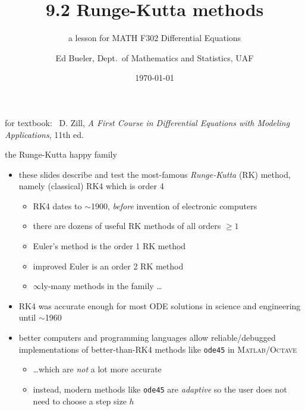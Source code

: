 \documentclass[urlcolor=blue,dvipsnames]{beamer}
\title{9.2 Runge-Kutta methods}
\subtitle{a lesson for MATH F302 Differential Equations}
\author{Ed Bueler, Dept.~of Mathematics and Statistics, UAF}
\date{\tiny \today}
\newcommand{\Matlab}{\textsc{Matlab}\xspace}
\newcommand{\Octave}{\textsc{Octave}\xspace}
\begin{document}
\renewcommand{\thefootnote}{{\color{green} \arabic{footnote}}}

\begin{frame}
\titlepage

\centerline{\tiny for textbook: \, D. Zill, \emph{A First Course in Differential Equations with Modeling Applications}, 11th ed.}
\end{frame}


\begin{frame}{the Runge-Kutta happy family}

\begin{itemize}
\item these slides describe and test the most-famous \emph{Runge-Kutta} (RK) method, namely \alert{(classical) RK4} which is \alert{order 4}
    \begin{itemize}
    \item RK4 dates to $\sim$1900, \emph{before} invention of electronic computers
    \item there are dozens of useful RK methods of all orders $\ge 1$
    \item Euler's method is the order 1 RK method
    \item improved Euler is an order 2 RK method
    \item $\infty$ly-many methods in the family \dots
    \end{itemize}
\item RK4 was accurate enough for most ODE solutions in science and engineering until $\sim$1960
\item better computers and programming languages allow reliable/debugged implementations of better-than-RK4 methods like \texttt{ode45} in \Matlab/\Octave
    \begin{itemize}
    \item \dots which are \emph{not} a lot more accurate
    \item instead, modern methods like \texttt{ode45} are \emph{adaptive} so the user does not need to choose a step size $h$
    \end{itemize}
\end{itemize}
\end{frame}
\end{document}
